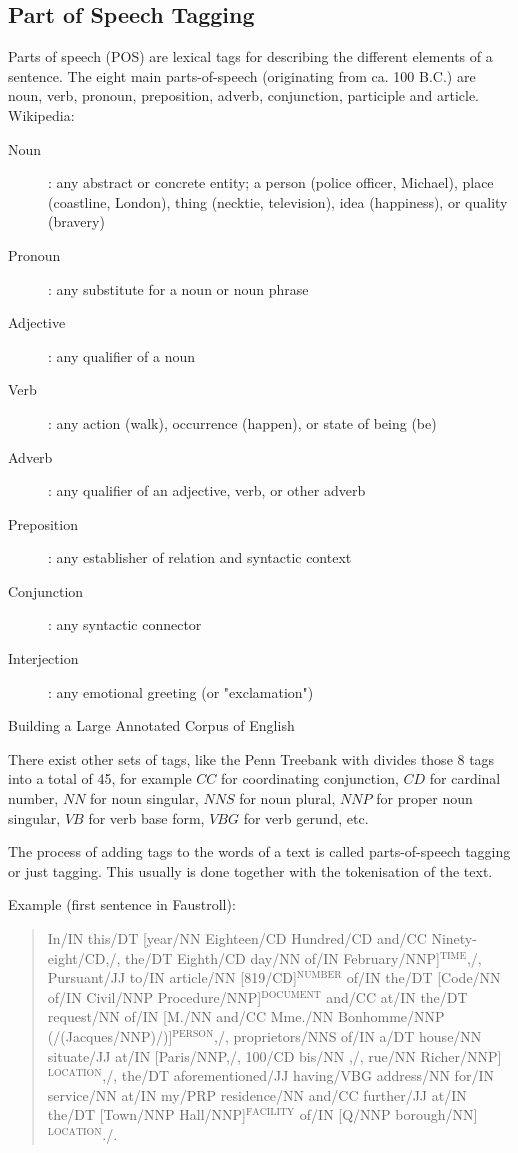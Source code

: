 \subsection{Part of Speech Tagging}

Parts of speech (POS) are lexical tags for describing the different elements of a sentence. The eight main parts-of-speech (originating from ca. 100 B.C.) are noun, verb, pronoun, preposition, adverb, conjunction, participle and article.
Wikipedia:

\begin{description}
\item [Noun]: any abstract or concrete entity; a person (police officer, Michael), place (coastline, London), thing (necktie, television), idea (happiness), or quality (bravery)
\item [Pronoun]: any substitute for a noun or noun phrase
\item [Adjective]: any qualifier of a noun
\item [Verb]: any action (walk), occurrence (happen), or state of being (be)
\item [Adverb]: any qualifier of an adjective, verb, or other adverb
\item [Preposition]: any establisher of relation and syntactic context
\item [Conjunction]: any syntactic connector
\item [Interjection]: any emotional greeting (or "exclamation")
\end{description}

Building a Large Annotated Corpus of English \citep{Marcus1993}

There exist other sets of tags, like the Penn Treebank with divides those 8 tags into a total of 45, for example $CC$ for coordinating conjunction, $CD$ for cardinal number, $NN$ for noun singular, $NNS$ for noun plural, $NNP$ for proper noun singular, $VB$ for verb base form, $VBG$ for verb gerund, etc.

The process of adding tags to the words of a text is called parts-of-speech tagging or just tagging. This usually is done together with the tokenisation of the text.

Example (first sentence in Faustroll):

\begin{quote}
In/IN this/DT [year/NN Eighteen/CD Hundred/CD and/CC Ninety-eight/CD,/, the/DT Eighth/CD day/NN of/IN February/NNP]$^{\text{TIME}}$,/, Pursuant/JJ to/IN article/NN [819/CD]$^{\text{NUMBER}}$ of/IN the/DT [Code/NN of/IN Civil/NNP Procedure/NNP]$^{\text{DOCUMENT}}$ and/CC at/IN the/DT request/NN of/IN [M./NN and/CC Mme./NN Bonhomme/NNP (/(Jacques/NNP)/)]$^{\text{PERSON}}$,/, proprietors/NNS of/IN a/DT house/NN situate/JJ at/IN [Paris/NNP,/, 100/CD bis/NN ,/, rue/NN Richer/NNP]$^{\text{LOCATION}}$,/, the/DT aforementioned/JJ having/VBG address/NN for/IN service/NN at/IN my/PRP residence/NN and/CC further/JJ at/IN the/DT [Town/NNP Hall/NNP]$^{\text{FACILITY}}$ of/IN [Q/NNP borough/NN]$^{\text{LOCATION}}$./.
\end{quote}

